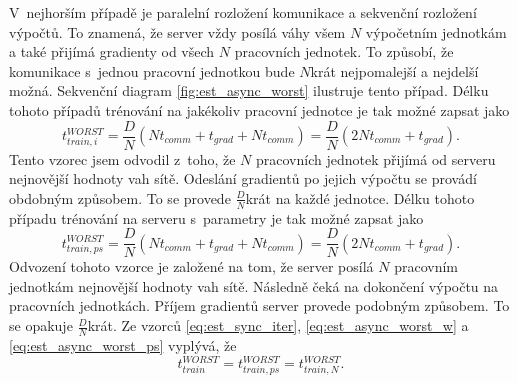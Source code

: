 V~nejhorším případě je paralelní rozložení komunikace a sekvenční rozložení výpočtů.
To znamená, že server vždy posílá váhy všem $N$ výpočetním jednotkám a také přijímá gradienty od všech $N$ pracovních jednotek.
To způsobí, že komunikace s~jednou pracovní jednotkou bude $N$krát nejpomalejší a nejdelší možná.
Sekvenční diagram \ref{fig:est_async_worst} ilustruje tento případ.
Délku tohoto případů trénování na jakékoliv pracovní jednotce je tak možné zapsat jako \begin{equation}t_{train,i}^{WORST}=\frac{D}{N}(Nt_{comm}+t_{grad}+Nt_{comm})=\frac{D}{N}(2Nt_{comm}+t_{grad}).\label{eq:est_async_worst_w}\end{equation}
Tento vzorec jsem odvodil z~toho, že $N$ pracovních jednotek přijímá od serveru nejnovější hodnoty vah sítě.
Odeslání gradientů po jejich výpočtu se provádí obdobným způsobem.
To se provede $\frac{D}{N}$krát na každé jednotce.
Délku tohoto případu trénování na serveru s~parametry je tak možné zapsat jako \begin{equation}t_{train,ps}^{WORST}=\frac{D}{N}(Nt_{comm}+t_{grad}+Nt_{comm})=\frac{D}{N}(2Nt_{comm}+t_{grad}).\label{eq:est_async_worst_ps}\end{equation}
Odvození tohoto vzorce je založené na tom, že server posílá $N$ pracovním jednotkám nejnovější hodnoty vah sítě.
Následně čeká na dokončení výpočtu na pracovních jednotkách.
Příjem gradientů server provede podobným způsobem.
To se opakuje $\frac{D}{N}$krát.
Ze vzorců \ref{eq:est_sync_iter}, \ref{eq:est_async_worst_w} a \ref{eq:est_async_worst_ps} vyplývá, že \begin{equation}t_{train}^{WORST}=t_{train,ps}^{WORST}=t_{train,N}^{WORST}.\label{eq:est_async_worst_f}\end{equation}

